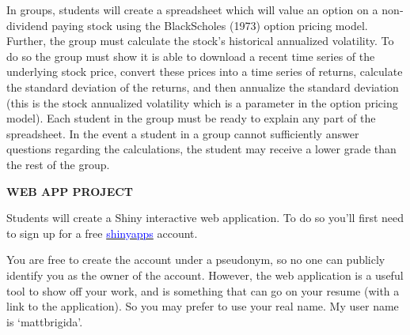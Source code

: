 \documentclass{article}
\begin{document}
In groups, students will create a spreadsheet which will value an option on a non­dividend
paying stock using the Black­Scholes (1973) option pricing model. Further, the group must calculate
the stock's historical annualized volatility. To do so the group must show it is able to download a recent
time series of the underlying stock price, convert these prices into a time series of returns, calculate the
standard deviation of the returns, and then annualize the standard deviation (this is the stock annualized
volatility which is a parameter in the option pricing model). Each student in the group must be ready to
explain any part of the spreadsheet. In the event a student in a group cannot sufficiently answer
questions regarding the calculations, the student may receive a lower grade than the rest of the group. 
\vspace*{5pt}
\begin{center}
{\bf WEB APP PROJECT}
\end{center}
Students will create a Shiny interactive web application.  To do so you'll first need to sign up for a free \href{https://www.shinyapps.io/}{\textcolor{blue}{shinyapps}} account.  

You are free to create the account under a pseudonym, so no one can publicly identify you as the owner of the account.  However, the web application is a useful tool to show off your work, and is something that can go on your resume (with a link to the application).  So you may prefer to use your real name.  My user name is `mattbrigida'.  
\end{document}
